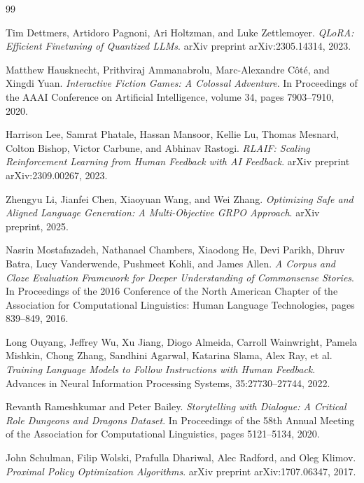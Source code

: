 \documentclass[11pt]{article}
\begin{document}
\begin{thebibliography}{99}

Tim Dettmers, Artidoro Pagnoni, Ari Holtzman, and Luke Zettlemoyer.
\textit{QLoRA: Efficient Finetuning of Quantized LLMs}.
arXiv preprint arXiv:2305.14314, 2023.

Matthew Hausknecht, Prithviraj Ammanabrolu, Marc-Alexandre C\^ot\'e, and Xingdi Yuan.
\textit{Interactive Fiction Games: A Colossal Adventure}.
In Proceedings of the AAAI Conference on Artificial Intelligence, volume 34, pages 7903--7910, 2020.

Harrison Lee, Samrat Phatale, Hassan Mansoor, Kellie Lu, Thomas Mesnard, Colton Bishop, Victor Carbune, and Abhinav Rastogi.
\textit{RLAIF: Scaling Reinforcement Learning from Human Feedback with AI Feedback}.
arXiv preprint arXiv:2309.00267, 2023.

Zhengyu Li, Jianfei Chen, Xiaoyuan Wang, and Wei Zhang.
\textit{Optimizing Safe and Aligned Language Generation: A Multi-Objective GRPO Approach}.
arXiv preprint, 2025.

Nasrin Mostafazadeh, Nathanael Chambers, Xiaodong He, Devi Parikh, Dhruv Batra, Lucy Vanderwende, Pushmeet Kohli, and James Allen.
\textit{A Corpus and Cloze Evaluation Framework for Deeper Understanding of Commonsense Stories}.
In Proceedings of the 2016 Conference of the North American Chapter of the Association for Computational Linguistics: Human Language Technologies, pages 839--849, 2016.

Long Ouyang, Jeffrey Wu, Xu Jiang, Diogo Almeida, Carroll Wainwright, Pamela Mishkin, Chong Zhang, Sandhini Agarwal, Katarina Slama, Alex Ray, et al.
\textit{Training Language Models to Follow Instructions with Human Feedback}.
Advances in Neural Information Processing Systems, 35:27730--27744, 2022.

Revanth Rameshkumar and Peter Bailey.
\textit{Storytelling with Dialogue: A Critical Role Dungeons and Dragons Dataset}.
In Proceedings of the 58th Annual Meeting of the Association for Computational Linguistics, pages 5121--5134, 2020.

John Schulman, Filip Wolski, Prafulla Dhariwal, Alec Radford, and Oleg Klimov.
\textit{Proximal Policy Optimization Algorithms}.
arXiv preprint arXiv:1707.06347, 2017.


\end{thebibliography}
\end{document}
